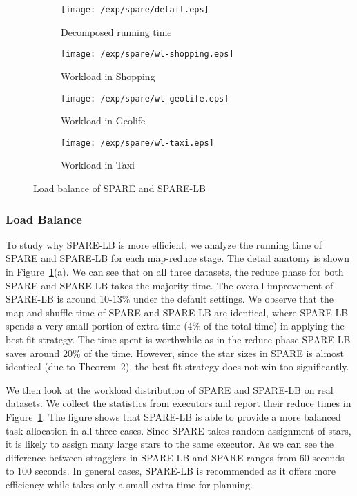 \begin{figure}[h]
\centering
	\begin{subfigure}[b]{0.22\textwidth}
        \texttt{[image: /exp/spare/detail.eps]}
        \caption{Decomposed running time}
    \end{subfigure}
 	 \begin{subfigure}[b]{0.22\textwidth}
        \texttt{[image: /exp/spare/wl-shopping.eps]}
        \caption{Workload in Shopping}
    \end{subfigure}
    \begin{subfigure}[b]{0.22\textwidth}
        \texttt{[image: /exp/spare/wl-geolife.eps]}
        \caption{Workload in Geolife}
    \end{subfigure}  
    \begin{subfigure}[b]{0.22\textwidth}
        \texttt{[image: /exp/spare/wl-taxi.eps]}
        \caption{Workload in Taxi}
    \end{subfigure}
\caption{Load balance of SPARE and SPARE-LB}
\label{exp:wl}
\end{figure}

\subsubsection{Load Balance}
To study why SPARE-LB is more efficient,
we analyze the running time of  SPARE and SPARE-LB for 
each map-reduce stage. 
The detail anatomy is shown in Figure~\ref{exp:wl}(a).
We can see that on all three datasets, the reduce phase for both SPARE and SPARE-LB takes the majority time. The overall improvement of SPARE-LB is around 10-13\%
under the default settings. We observe that the map and shuffle time
of SPARE and SPARE-LB are identical, where SPARE-LB spends a very small portion of extra time (4\% of the total time)
in applying the best-fit strategy. The time spent is worthwhile
as in the reduce phase SPARE-LB saves around 20\% of the time. However, since the star sizes in SPARE is almost identical (due to Theorem~2), the best-fit strategy does not win too significantly.

We then look at the workload distribution of SPARE and SPARE-LB on real datasets. We collect the statistics from executors
and report their reduce times in Figure~\ref{exp:wl}. The figure shows that SPARE-LB is able to provide a more balanced task allocation in all three cases. Since SPARE takes random assignment
of stars, it is likely to assign many large stars to the same executor. As we can see the difference between stragglers in
SPARE-LB and SPARE ranges from 60 seconds to 100 seconds. In general cases, SPARE-LB is recommended as it offers more efficiency while takes only a small extra time for planning.

